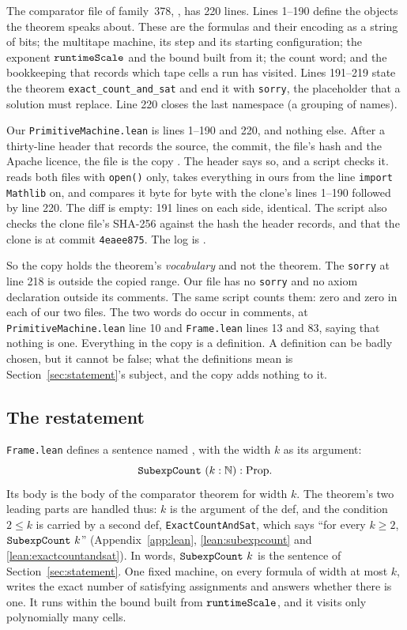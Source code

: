 The comparator file of family~378,
, has 220
lines. Lines 1--190 define the objects the theorem speaks about. These are the
formulas and their encoding as a string of bits; the multitape machine, its
step and its starting configuration; the exponent $\texttt{runtimeScale}$ and
the bound built from it; the count word; and the bookkeeping that
records which tape cells a run has visited. Lines 191--219 state the
theorem \texttt{exact\_count\_and\_sat} and end it with \texttt{sorry},
the placeholder that a solution must replace. Line 220 closes the last namespace (a grouping of names).

Our \texttt{PrimitiveMachine.lean} is lines 1--190 and 220, and nothing
else. After a thirty-line header that records the source, the commit,
the file's hash and the Apache licence, the file is the copy
. The header says so, and a script checks it.
 reads both files with
\texttt{open()} only, takes everything in ours from the line
\texttt{import Mathlib} on, and compares it byte for byte with the
clone's lines 1--190 followed by line 220. The diff is empty: 191 lines
on each side, identical. The script also checks the clone file's
SHA-256 against the hash the header records, and that the clone is at
commit \texttt{4eaee875}. The log is .

So the copy holds the theorem's \emph{vocabulary} and not the theorem.
The \texttt{sorry} at line 218 is outside the copied range. Our file
has no \texttt{sorry} and no axiom declaration outside its comments. The
same script counts them: zero and zero in each of our two files. The two
words do occur in comments, at \texttt{PrimitiveMachine.lean} line 10 and
\texttt{Frame.lean} lines 13 and 83, saying that nothing is one. Everything in the
copy is a definition. A definition can be badly chosen, but it cannot be
false; what the definitions mean is Section~\ref{sec:statement}'s
subject, and the copy adds nothing to it.

\subsection{The restatement}
\label{sec:lean-restatement}

\texttt{Frame.lean} defines a sentence named \SubexpCount{}, with the
width $k$ as its argument:
\[
  \texttt{SubexpCount}\ (k : \mathbb{N}) : \mathrm{Prop}.
\]
Its body is the body of the comparator theorem for width $k$. The
theorem's two leading parts are handled thus: $k$ is the argument of the
def, and the condition $2 \le k$ is carried by a second def,
\texttt{ExactCountAndSat}, which says ``for every $k \ge 2$,
\(\texttt{SubexpCount}\ k\)'' (Appendix~\ref{app:lean}, \ref{lean:subexpcount}
and \ref{lean:exactcountandsat}). In words, \(\texttt{SubexpCount}\ k\) is the
sentence of Section~\ref{sec:statement}. One fixed machine, on every
formula of width at most $k$, writes the exact number of satisfying
assignments and answers whether there is one. It runs within the bound built
from $\texttt{runtimeScale}$, and it visits only polynomially many cells.

